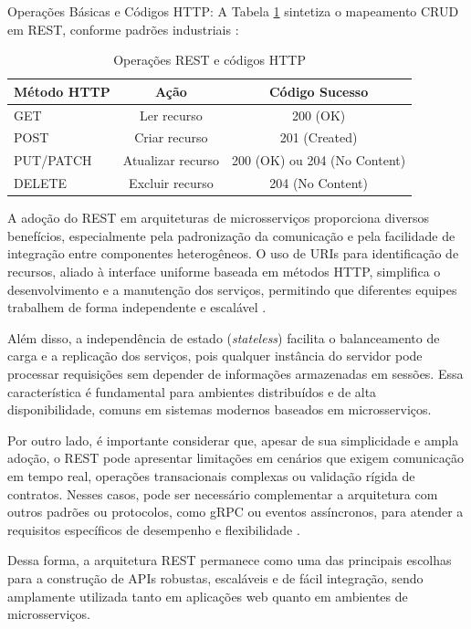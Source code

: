 Operações Básicas e Códigos HTTP:
A Tabela \ref{tab:rest_operations} sintetiza o mapeamento CRUD em REST, conforme padrões industriais \cite{fielding2000rest}:

\begin{table}[h]
\centering
\caption{Operações REST e códigos HTTP}
\label{tab:rest_operations}
\begin{tabular}{|l|c|c|}
\hline
Método HTTP & Ação & Código Sucesso \\ \hline
GET & Ler recurso & 200 (OK) \\ \hline
POST & Criar recurso & 201 (Created) \\ \hline
PUT/PATCH & Atualizar recurso & 200 (OK) ou 204 (No Content) \\ \hline
DELETE & Excluir recurso & 204 (No Content) \\ \hline
\end{tabular}
\end{table}

A adoção do REST em arquiteturas de microsserviços proporciona diversos benefícios, especialmente pela padronização da comunicação e pela facilidade de integração entre componentes heterogêneos. O uso de URIs para identificação de recursos, aliado à interface uniforme baseada em métodos HTTP, simplifica o desenvolvimento e a manutenção dos serviços, permitindo que diferentes equipes trabalhem de forma independente e escalável \cite{fielding2000rest, maso2024comparativo}.

Além disso, a independência de estado (\textit{stateless}) facilita o balanceamento de carga e a replicação dos serviços, pois qualquer instância do servidor pode processar requisições sem depender de informações armazenadas em sessões. Essa característica é fundamental para ambientes distribuídos e de alta disponibilidade, comuns em sistemas modernos baseados em microsserviços.

Por outro lado, é importante considerar que, apesar de sua simplicidade e ampla adoção, o REST pode apresentar limitações em cenários que exigem comunicação em tempo real, operações transacionais complexas ou validação rígida de contratos. Nesses casos, pode ser necessário complementar a arquitetura com outros padrões ou protocolos, como gRPC ou eventos assíncronos, para atender a requisitos específicos de desempenho e flexibilidade \cite{niswar2023performance}.

Dessa forma, a arquitetura REST permanece como uma das principais escolhas para a construção de APIs robustas, escaláveis e de fácil integração, sendo amplamente utilizada tanto em aplicações web quanto em ambientes de microsserviços.


